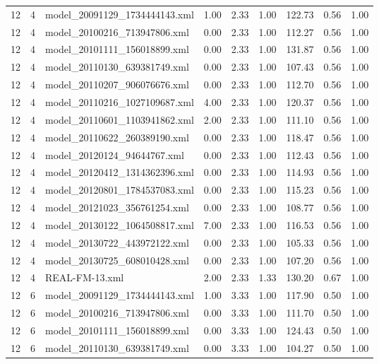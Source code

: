 \begin{table}[ht]
\begin{tabular}{rrlrrrrrr}
   12 &   4 & model\_20091129\_1734444143.xml & 1.00 & 2.33 & 1.00 & 122.73 & 0.56 & 1.00 \\ 
   12 &   4 & model\_20100216\_713947806.xml & 0.00 & 2.33 & 1.00 & 112.27 & 0.56 & 1.00 \\ 
   12 &   4 & model\_20101111\_156018899.xml & 0.00 & 2.33 & 1.00 & 131.87 & 0.56 & 1.00 \\ 
   12 &   4 & model\_20110130\_639381749.xml & 0.00 & 2.33 & 1.00 & 107.43 & 0.56 & 1.00 \\ 
   12 &   4 & model\_20110207\_906076676.xml & 0.00 & 2.33 & 1.00 & 112.70 & 0.56 & 1.00 \\ 
   12 &   4 & model\_20110216\_1027109687.xml & 4.00 & 2.33 & 1.00 & 120.37 & 0.56 & 1.00 \\ 
   12 &   4 & model\_20110601\_1103941862.xml & 2.00 & 2.33 & 1.00 & 111.10 & 0.56 & 1.00 \\ 
   12 &   4 & model\_20110622\_260389190.xml & 0.00 & 2.33 & 1.00 & 118.47 & 0.56 & 1.00 \\ 
   12 &   4 & model\_20120124\_94644767.xml & 0.00 & 2.33 & 1.00 & 112.43 & 0.56 & 1.00 \\ 
   12 &   4 & model\_20120412\_1314362396.xml & 0.00 & 2.33 & 1.00 & 114.93 & 0.56 & 1.00 \\ 
   12 &   4 & model\_20120801\_1784537083.xml & 0.00 & 2.33 & 1.00 & 115.23 & 0.56 & 1.00 \\ 
   12 &   4 & model\_20121023\_356761254.xml & 0.00 & 2.33 & 1.00 & 108.77 & 0.56 & 1.00 \\ 
   12 &   4 & model\_20130122\_1064508817.xml & 7.00 & 2.33 & 1.00 & 116.53 & 0.56 & 1.00 \\ 
   12 &   4 & model\_20130722\_443972122.xml & 0.00 & 2.33 & 1.00 & 105.33 & 0.56 & 1.00 \\ 
   12 &   4 & model\_20130725\_608010428.xml & 0.00 & 2.33 & 1.00 & 107.20 & 0.56 & 1.00 \\ 
   12 &   4 & REAL-FM-13.xml & 2.00 & 2.33 & 1.33 & 130.20 & 0.67 & 1.00 \\ 
   12 &   6 & model\_20091129\_1734444143.xml & 1.00 & 3.33 & 1.00 & 117.90 & 0.50 & 1.00 \\ 
   12 &   6 & model\_20100216\_713947806.xml & 0.00 & 3.33 & 1.00 & 111.70 & 0.50 & 1.00 \\ 
   12 &   6 & model\_20101111\_156018899.xml & 0.00 & 3.33 & 1.00 & 124.43 & 0.50 & 1.00 \\ 
   12 &   6 & model\_20110130\_639381749.xml & 0.00 & 3.33 & 1.00 & 104.27 & 0.50 & 1.00 \\ 

\end{tabular}
\end{table}
